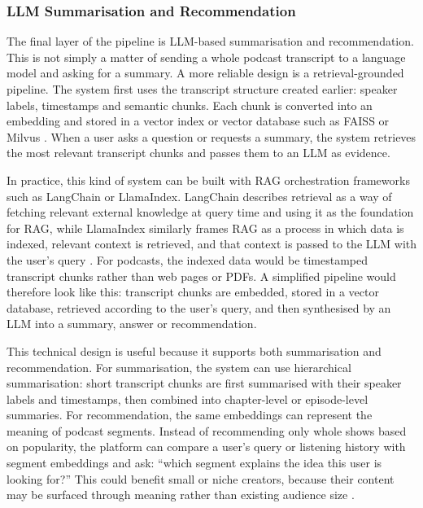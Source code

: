 \documentclass[11pt,a4paper]{article}
\begin{document}
\subsubsection{LLM Summarisation and Recommendation}

The final layer of the pipeline is LLM-based summarisation and recommendation. This is not simply a matter of sending a whole podcast transcript to a language model and asking for a summary. A more reliable design is a retrieval-grounded pipeline. The system first uses the transcript structure created earlier: speaker labels, timestamps and semantic chunks. Each chunk is converted into an embedding and stored in a vector index or vector database such as FAISS or Milvus \cite{Johnson2017FAISS,Wang2021Milvus}. When a user asks a question or requests a summary, the system retrieves the most relevant transcript chunks and passes them to an LLM as evidence.

In practice, this kind of system can be built with RAG orchestration frameworks such as LangChain or LlamaIndex. LangChain describes retrieval as a way of fetching relevant external knowledge at query time and using it as the foundation for RAG, while LlamaIndex similarly frames RAG as a process in which data is indexed, relevant context is retrieved, and that context is passed to the LLM with the user's query \cite{LangChain2026Retrieval,LlamaIndex2026RAG}. For podcasts, the indexed data would be timestamped transcript chunks rather than web pages or PDFs. A simplified pipeline would therefore look like this: transcript chunks are embedded, stored in a vector database, retrieved according to the user's query, and then synthesised by an LLM into a summary, answer or recommendation.

This technical design is useful because it supports both summarisation and recommendation. For summarisation, the system can use hierarchical summarisation: short transcript chunks are first summarised with their speaker labels and timestamps, then combined into chapter-level or episode-level summaries. For recommendation, the same embeddings can represent the meaning of podcast segments. Instead of recommending only whole shows based on popularity, the platform can compare a user's query or listening history with segment embeddings and ask: ``which segment explains the idea this user is looking for?'' This could benefit small or niche creators, because their content may be surfaced through meaning rather than existing audience size \cite{Aziz2021Underserved,Spotify2022NLS}.
\end{document}
